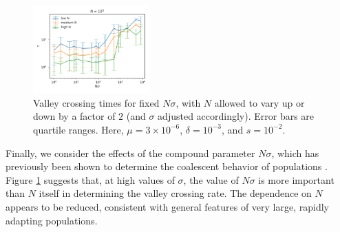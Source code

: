 \documentclass[rmp]{revtex4}
\begin{document}
\begin{figure}
\includegraphics[width=0.4\textwidth]{Figures/bands.pdf}
\caption{Valley crossing times for fixed $N\sigma$, with $N$ allowed to vary up or down by a factor of $2$ (and $\sigma$ adjusted accordingly). Error bars are quartile ranges. Here, $\mu = 3 \times 10^{-6}$, $\delta = 10^{-3}$, and $s = 10^{-2}$.}
\label{fig:bands}
\end{figure}

Finally, we consider the effects of the compound parameter $N\sigma$, which has previously been shown to determine the coalescent behavior of populations \citep{neher_hallatschek_2013, neher_kessinger_2013}.
Figure \ref{fig:bands} suggests that, at high values of $\sigma$, the value of $N\sigma$ is more important than $N$ itself in determining the valley crossing rate.
The dependence on $N$ appears to be reduced, consistent with general features of very large, rapidly adapting populations.




\end{document}
